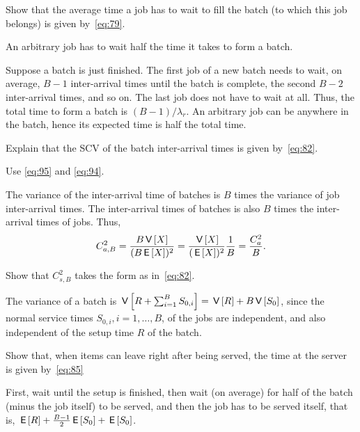 \begin{exercise}\label{ex:48}
  Show that the average time a job has to wait to fill the batch (to which this job belongs) is given by~\cref{eq:79}.
\begin{hint}
An arbitrary job has to wait half the time it takes  to form a batch.
 \end{hint}
\begin{solution}
  Suppose a batch is just finished.
  The first job of a new batch needs to wait, on average, $B-1$ inter-arrival times until the batch is complete, the second $B-2$ inter-arrival times, and so on.
  The last job does not have to wait at all.
  Thus, the total time to form a batch is $(B-1)/\lambda_r$.
  An arbitrary job can be anywhere in the batch, hence its expected time is half the total time.
\end{solution}
\end{exercise}


\begin{exercise}\label{ex:490}
Explain that the SCV of the batch inter-arrival times is given by~\cref{eq:82}.
\begin{hint}
Use  \cref{eq:95} and \cref{eq:94}.
\end{hint}
\begin{solution}
The variance of the inter-arrival time of batches is $B$ times the variance of job inter-arrival times. The inter-arrival times of batches is also $B$ times the inter-arrival times of jobs. Thus,
\begin{equation*}
 C_{a,B}^2 = \frac{B \,\mathsf{V}\left[X\right]}{(B \,\mathsf{E}\left[X\right])^2} = \frac{\,\mathsf{V}\left[X\right]}{(\,\mathsf{E}\left[X\right])^2} \frac 1 B = \frac{C_a^2}{B}.
\end{equation*}
\end{solution}
\end{exercise}


\begin{exercise}\label{ex:491}
Show that $C_{s,B}^2$ takes the form as in~\cref{eq:82}.
\begin{solution}
 The variance of a batch is $\,\mathsf{V}\left[R+\sum_{i=1}^B S_{0,i} \right] = \,\mathsf{V}\left[R\right] + B\,\mathsf{V}\left[S_0\right]$, since the normal service times $S_{0,i}, i=1,\ldots,B$, of the jobs are independent, and also independent of the setup time $R$ of the batch.
\end{solution}
\end{exercise}

\begin{exercise}\label{ex:492}
Show that, when items can leave right after being served, the time at the server is given by~\cref{eq:85}
\begin{solution}
 First, wait until the setup is finished, then wait (on average) for half of the batch (minus the job itself) to be served, and then the job has to be served itself, that is,
$\,\mathsf{E}\left[R\right] + \frac{B-1}{2}\,\mathsf{E}\left[S_0\right] +\,\mathsf{E}\left[S_0\right]$.
\end{solution}
\end{exercise}





